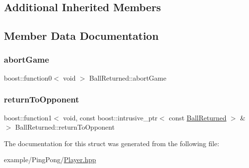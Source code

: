 \subsection*{Additional Inherited Members}


\subsection{Member Data Documentation}
\mbox{\label{struct_ball_returned_a8e02be3939205f10a893cac74713deec}} 
\subsubsection{\texorpdfstring{abort\+Game}{abortGame}}
{\footnotesize\ttfamily boost\+::function0$<$ void $>$ Ball\+Returned\+::abort\+Game}

\mbox{\label{struct_ball_returned_abaa8b43565818174bd1e41234a52bcec}} 
\subsubsection{\texorpdfstring{return\+To\+Opponent}{returnToOpponent}}
{\footnotesize\ttfamily boost\+::function1$<$ void, const boost\+::intrusive\+\_\+ptr$<$ const \mbox{\hyperlink{struct_ball_returned}{Ball\+Returned}} $>$ \& $>$ Ball\+Returned\+::return\+To\+Opponent}



The documentation for this struct was generated from the following file\+:\begin{DoxyCompactItemize}
\item 
example/\+Ping\+Pong/\mbox{\hyperlink{_player_8hpp}{Player.\+hpp}}\end{DoxyCompactItemize}
